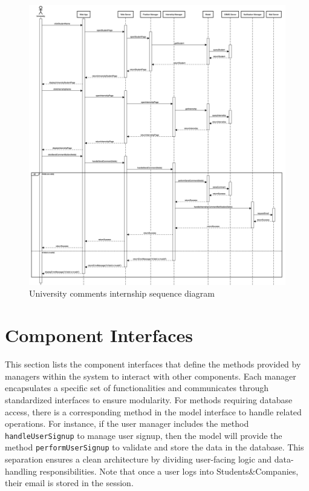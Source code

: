 \begin{figure}[h!] 
    \centering
    \includegraphics[width=16cm]{images/sequence-diagrams/university-comments-internship.png}
    \caption{University comments internship sequence diagram}
\end{figure}

\clearpage
\section{Component Interfaces}
This section lists the component interfaces that define the methods provided by managers within the system to interact with other components.
Each manager encapsulates a specific set of functionalities and communicates through standardized interfaces to ensure modularity.
For methods requiring database access, there is a corresponding method in the model interface to handle related operations. 
For instance, if the user manager includes the method \texttt{handleUserSignup} to manage user signup, then the model will provide the method \texttt{performUserSignup} to validate and store the data in the database.
This separation ensures a clean architecture by dividing user-facing logic and data-handling responsibilities. 
Note that once a user logs into Students\&Companies, their email is stored in the session.

